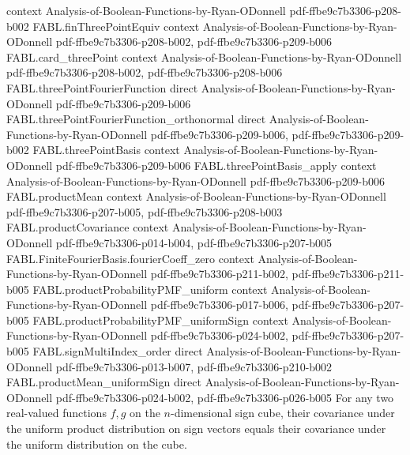 \begin{theorem}
  {context}
  {Analysis-of-Boolean-Functions-by-Ryan-ODonnell}
  {pdf-ffbe9c7b3306-p208-b002}
\proofstep
  {FABL.finThreePointEquiv}
  {context}
  {Analysis-of-Boolean-Functions-by-Ryan-ODonnell}
  {pdf-ffbe9c7b3306-p208-b002,
    pdf-ffbe9c7b3306-p209-b006}
\proofstep
  {FABL.card_threePoint}
  {context}
  {Analysis-of-Boolean-Functions-by-Ryan-ODonnell}
  {pdf-ffbe9c7b3306-p208-b002,
    pdf-ffbe9c7b3306-p208-b006}
\proofstep
  {FABL.threePointFourierFunction}
  {direct}
  {Analysis-of-Boolean-Functions-by-Ryan-ODonnell}
  {pdf-ffbe9c7b3306-p209-b006}
\proofstep
  {FABL.threePointFourierFunction_orthonormal}
  {direct}
  {Analysis-of-Boolean-Functions-by-Ryan-ODonnell}
  {pdf-ffbe9c7b3306-p209-b006,
    pdf-ffbe9c7b3306-p209-b002}
\proofstep
  {FABL.threePointBasis}
  {context}
  {Analysis-of-Boolean-Functions-by-Ryan-ODonnell}
  {pdf-ffbe9c7b3306-p209-b006}
\proofstep
  {FABL.threePointBasis_apply}
  {context}
  {Analysis-of-Boolean-Functions-by-Ryan-ODonnell}
  {pdf-ffbe9c7b3306-p209-b006}
\proofstep
  {FABL.productMean}
  {context}
  {Analysis-of-Boolean-Functions-by-Ryan-ODonnell}
  {pdf-ffbe9c7b3306-p207-b005,
    pdf-ffbe9c7b3306-p208-b003}
\proofstep
  {FABL.productCovariance}
  {context}
  {Analysis-of-Boolean-Functions-by-Ryan-ODonnell}
  {pdf-ffbe9c7b3306-p014-b004,
    pdf-ffbe9c7b3306-p207-b005}
\proofstep
  {FABL.FiniteFourierBasis.fourierCoeff_zero}
  {context}
  {Analysis-of-Boolean-Functions-by-Ryan-ODonnell}
  {pdf-ffbe9c7b3306-p211-b002,
    pdf-ffbe9c7b3306-p211-b005}
\proofstep
  {FABL.productProbabilityPMF_uniform}
  {context}
  {Analysis-of-Boolean-Functions-by-Ryan-ODonnell}
  {pdf-ffbe9c7b3306-p017-b006,
    pdf-ffbe9c7b3306-p207-b005}
\proofstep
  {FABL.productProbabilityPMF_uniformSign}
  {context}
  {Analysis-of-Boolean-Functions-by-Ryan-ODonnell}
  {pdf-ffbe9c7b3306-p024-b002,
    pdf-ffbe9c7b3306-p207-b005}
\proofstep
  {FABL.signMultiIndex_order}
  {direct}
  {Analysis-of-Boolean-Functions-by-Ryan-ODonnell}
  {pdf-ffbe9c7b3306-p013-b007,
    pdf-ffbe9c7b3306-p210-b002}
\proofstep
  {FABL.productMean_uniformSign}
  {direct}
  {Analysis-of-Boolean-Functions-by-Ryan-ODonnell}
  {pdf-ffbe9c7b3306-p024-b002,
    pdf-ffbe9c7b3306-p026-b005}
For any two real-valued functions $f,g$ on the $n$-dimensional sign cube, their
covariance under the uniform product distribution on sign vectors equals their
covariance under the uniform distribution on the cube.
\end{theorem}


